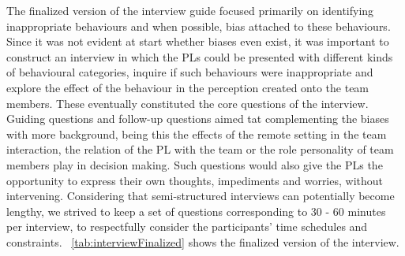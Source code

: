 The finalized version of the interview guide focused primarily on identifying inappropriate behaviours and when possible, bias attached to these behaviours. Since it was not evident at start whether biases even exist, it was important to construct an interview in which the PLs could be presented with different kinds of behavioural categories, inquire if such behaviours were inappropriate and explore the effect of the behaviour in the perception created onto the team members. These eventually constituted the core questions of the interview. Guiding questions and follow-up questions aimed tat complementing the biases with more background, being this the effects of the remote setting in the team interaction, the relation of the PL with the team or the role personality of team members play in decision making. Such questions would also give the PLs the opportunity to express their own thoughts, impediments and worries, without intervening. Considering that semi-structured interviews can potentially become lengthy, we strived to keep a set of questions corresponding to 30 - 60 minutes per interview, to respectfully consider the participants' time schedules and constraints.  ~\autoref{tab:interviewFinalized} shows the finalized version of the interview.

